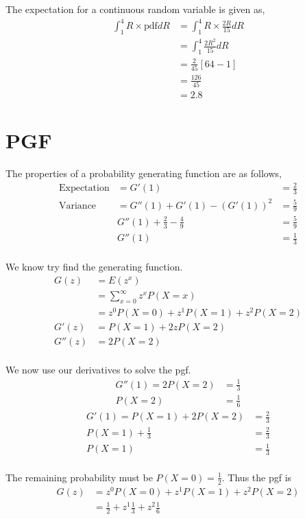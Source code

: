 \documentclass{article}
\begin{document}
The expectation for a continuous random variable is given as,
\begin{align*}
    \int_1^4 R \times \text{pdf} dR
    &= \int_1^4 R \times \frac{2R}{15} dR \\
    &= \int_1^4 \frac{2R^2}{15} dR \\
    &= \frac{2}{45} [64-1] \\
    &= \frac{126}{45} \\
    &= 2.8
\end{align*}

\section{PGF}
The properties of a probability generating function are as follows,
\begin{align*}
    \text{Expectation} &= G'(1) &= \frac{2}{3} \\
    \text{Variance} &= G''(1) + G'(1) - (G'(1))^2 &= \frac{5}{9} \\
    & G''(1) + \frac{2}{3} - \frac{4}{9} &= \frac{5}{9} \\
    & G''(1) &= \frac{1}{3} \\
\end{align*}

We know try find the generating function.
\begin{align*}
    G(z) &= E(z^x) \\
    &= \sum_{x=0}^\infty z^x P(X=x) \\
    &= z^0 P(X=0) + z^1 P(X=1) + z^2 P(X=2) \\
    G'(z) &= P(X=1) + 2z P(X=2) \\
    G''(z) &= 2P(X=2) \\
\end{align*}

We now use our derivatives to solve the pgf.
\begin{align*}
    G''(1) = 2P(X=2) &= \frac{1}{3} \\
    P(X=2) &= \frac{1}{6}
\end{align*}
\begin{align*}
    G'(1) = P(X=1) + 2P(X=2) &= \frac{2}{3} \\
    P(X=1) + \frac{1}{3} &= \frac{2}{3} \\
    P(X=1) &= \frac{1}{3} \\
\end{align*}

The remaining probability must be $P(X=0) = \frac{1}{2}$. Thus the pgf is
\begin{align*}
    G(z) &= z^0 P(X=0) + z^1 P(X=1) + z^2 P(X=2) \\
    &= \frac{1}{2} + z^1 \frac{1}{3} + z^2 \frac{1}{6} \\
\end{align*}
\end{document}
